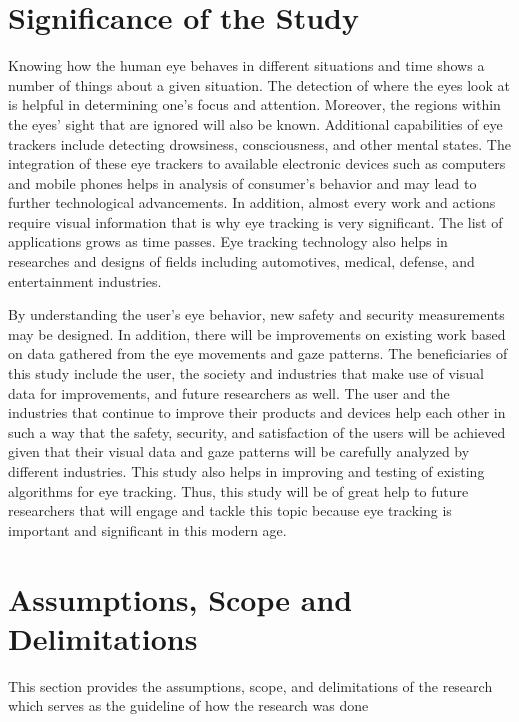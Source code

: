 \section{Significance of the Study}

Knowing how the human eye behaves in different situations and time shows a number of things about a given situation. The detection of where the eyes look at is helpful in determining one’s focus and attention. Moreover, the regions within the eyes’ sight that are ignored will also be known. Additional capabilities of eye trackers include detecting drowsiness, consciousness, and other mental states. The integration of these eye trackers to available electronic devices such as computers and mobile phones helps in analysis of consumer’s behavior and may lead to further technological advancements. In addition, almost every work and actions require visual information that is why eye tracking is very significant. The list of applications grows as time passes. Eye tracking technology also helps in researches and designs of fields including automotives, medical, defense, and entertainment industries. 

By understanding the user’s eye behavior, new safety and security measurements may be designed. In addition, there will be improvements on existing work based on data gathered from the eye movements and gaze patterns. The beneficiaries of this study include the user, the society and industries that make use of visual data for improvements, and future researchers as well. The user and the industries that continue to improve their products and devices help each other in such a way that the safety, security, and satisfaction of the users will be achieved given that their visual data and gaze patterns will be carefully analyzed by different industries. This study also helps in improving and testing of existing algorithms for eye tracking. Thus, this study will be of great help to future researchers that will engage and tackle this topic because eye tracking is important and significant in this modern age. 




\section{Assumptions, Scope and Delimitations}

This section provides the assumptions, scope, and delimitations of the research which serves as the guideline of how the research was done

